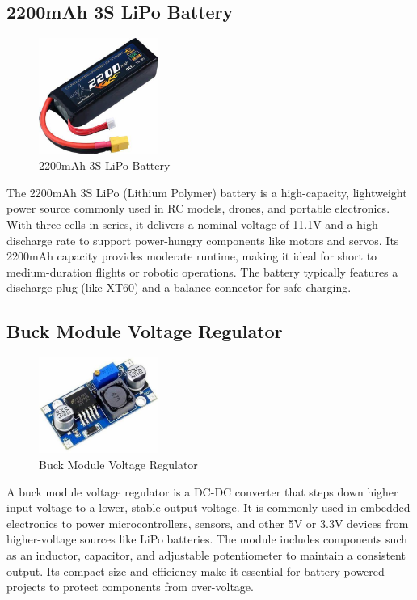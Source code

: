 \subsection{2200mAh 3S LiPo Battery}
\begin{figure}[H]
\centering
\includegraphics[width=0.35\textwidth]{images/2200 mah LIPO battery.jpg}
\caption{2200mAh 3S LiPo Battery}
\end{figure}
The 2200mAh 3S LiPo (Lithium Polymer) battery is a high-capacity, lightweight power source commonly used in RC models, drones, and portable electronics. With three cells in series, it delivers a nominal voltage of 11.1V and a high discharge rate to support power-hungry components like motors and servos. Its 2200mAh capacity provides moderate runtime, making it ideal for short to medium-duration flights or robotic operations. The battery typically features a discharge plug (like XT60) and a balance connector for safe charging.

\subsection{Buck Module Voltage Regulator}
\begin{figure}[H]
\centering
\includegraphics[width=0.35\textwidth]{images/Buck Module Voltage Regulator.jpg}
\caption{Buck Module Voltage Regulator}
\end{figure}
A buck module voltage regulator is a DC-DC converter that steps down higher input voltage to a lower, stable output voltage. It is commonly used in embedded electronics to power microcontrollers, sensors, and other 5V or 3.3V devices  from higher-voltage sources like LiPo batteries. The module includes components such as an inductor, capacitor, and adjustable potentiometer to maintain a consistent output. Its compact size and efficiency make it essential for battery-powered projects to protect components from over-voltage.

